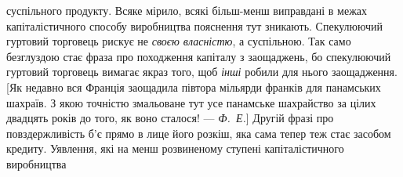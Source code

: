 суспільного продукту. Всяке мірило, всякі більш-менш виправдані в межах капіталістичного способу
виробництва пояснення тут зникають. Спекулюючий гуртовий торговець
рискує не \emph{своєю власністю}, а суспільною. Так само безглуздою стає фраза про походження капіталу з
заощаджень,
бо спекулюючий гуртовий торговець вимагає якраз того, щоб
\emph{інші} робили для нього заощадження. [Як недавно вся Франція
заощадила півтора мільярди франків для панамських шахраїв.
З якою точністю змальоване тут усе панамське шахрайство за
цілих двадцять років до того, як воно сталося! — \emph{Ф.~Е.}]
Другій фразі про повздержливість б’є прямо в лице його розкіш, яка сама тепер теж стає засобом
кредиту. Уявлення, які
на менш розвиненому ступені капіталістичного виробництва
\parbreak{}  %
